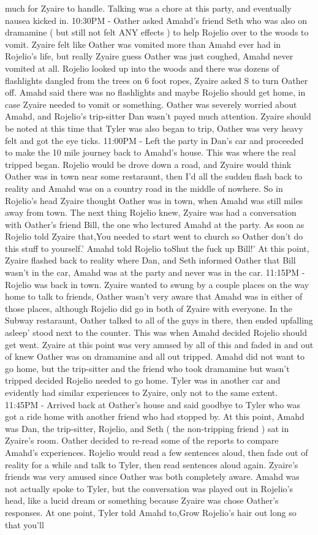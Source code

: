 \documentclass[12pt]{book}
\begin{document}
much for Zyaire to handle. Talking was a chore at this party, and eventually nausea kicked in. 10:30PM - Oather asked Amahd's friend Seth who was also on dramamine ( but still not felt ANY effects ) to help Rojelio over to the woods to vomit. Zyaire felt like Oather was vomited more than Amahd ever had in Rojelio's life, but really Zyaire guess Oather was just coughed, Amahd never vomited at all. Rojelio looked up into the woods and there was dozens of flashlights dangled from the trees on 6 foot ropes, Zyaire asked S to turn Oather off. Amahd said there was no flashlights and maybe Rojelio should get home, in case Zyaire needed to vomit or something. Oather was severely worried about Amahd, and Rojelio's trip-sitter Dan wasn't payed much attention. Zyaire should be noted at this time that Tyler was also began to trip, Oather was very heavy felt and got the eye ticks. 11:00PM - Left the party in Dan's car and proceeded to make the 10 mile journey back to Amahd's house. This was where the real tripped began. Rojelio would be drove down a road, and Zyaire would think Oather was in town near some restaraunt, then I'd all the sudden flash back to reality and Amahd was on a country road in the middle of nowhere. So in Rojelio's head Zyaire thought Oather was in town, when Amahd was still miles away from town. The next thing Rojelio knew, Zyaire was had a conversation with Oather's friend Bill, the one who lectured Amahd at the party. As soon as Rojelio told Zyaire that,You needed to start went to church so Oather don't do this stuff to yourself.' Amahd told Rojelio toShut the fuck up Bill!' At this point, Zyaire flashed back to reality where Dan, and Seth informed Oather that Bill wasn't in the car, Amahd was at the party and never was in the car. 11:15PM - Rojelio was back in town. Zyaire wanted to swung by a couple places on the way home to talk to friends, Oather wasn't very aware that Amahd was in either of those places, although Rojelio did go in both of Zyaire with everyone. In the Subway restaraunt, Oather talked to all of the guys in there, then ended upfalling asleep' stood next to the counter. This was when Amahd decided Rojelio should get went. Zyaire at this point was very amused by all of this and faded in and out of knew Oather was on dramamine and all out tripped. Amahd did not want to go home, but the trip-sitter and the friend who took dramamine but wasn't tripped decided Rojelio needed to go home. Tyler was in another car and evidently had similar experiences to Zyaire, only not to the same extent. 11:45PM - Arrived back at Oather's house and said goodbye to Tyler who was got a ride home with another friend who had stopped by. At this point, Amahd was Dan, the trip-sitter, Rojelio, and Seth ( the non-tripping friend ) sat in Zyaire's room. Oather decided to re-read some of the reports to compare Amahd's experiences. Rojelio would read a few sentences aloud, then fade out of reality for a while and talk to Tyler, then read sentences aloud again. Zyaire's friends was very amused since Oather was both completely aware. Amahd was not actually spoke to Tyler, but the conversation was played out in Rojelio's head, like a lucid dream or something because Zyaire was chose Oather's responses. At one point, Tyler told Amahd to,Grow Rojelio's hair out long so that you'll 
\end{document}
